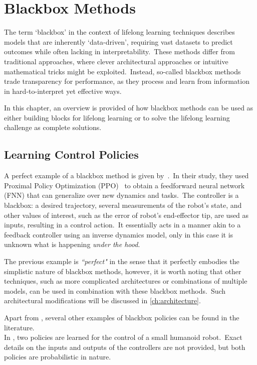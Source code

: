 \chapter{Blackbox Methods}\label{ch:blackbox}
The term `blackbox' in the context of lifelong learning techniques describes models that are inherently `data-driven', requiring vast datasets to predict outcomes while often lacking in interpretability.\ These methods differ from traditional approaches, where clever architectural approaches or intuitive mathematical tricks might be exploited.\ Instead, so-called blackbox methods trade transparency for performance, as they process and learn from information in hard-to-interpret yet effective ways.

In this chapter, an overview is provided of how blackbox methods can be used as either building blocks for lifelong learning or to solve the lifelong learning challenge as complete solutions.


\section{Learning Control Policies}\label{sec:policies}
A perfect example of a blackbox method is given by~\textcite{Alessi2023}.\ In their study, they used Proximal Policy Optimization (PPO)~\cite{Schulman2017} to obtain a feedforward neural network (FNN) that can generalize over new dynamics and tasks.\ The controller is a blackbox: a desired trajectory, several measurements of the robot's state, and other values of interest, such as the error of robot's end-effector tip, are used as inputs, resulting in a control action.\ It essentially acts in a manner akin to a feedback controller using an inverse dynamics model, only in this case it is unknown what is happening \emph{under the hood}.

The previous example is \emph{``perfect"} in the sense that it perfectly embodies the simplistic nature of blackbox methods, however, it is worth noting that other techniques, such as more complicated architectures or combinations of multiple models, can be used in combination with these blackbox methods.\ Such architectural modifications will be discussed in \cref{ch:architecture}.

Apart from \textcite{Alessi2023}, several other examples of blackbox policies can be found in the literature.\\
In \textcite{Zhou2022}, two policies are learned for the control of a small humanoid robot.\ Exact details on the inputs and outputs of the controllers are not provided, but both policies are probabilistic in nature.

